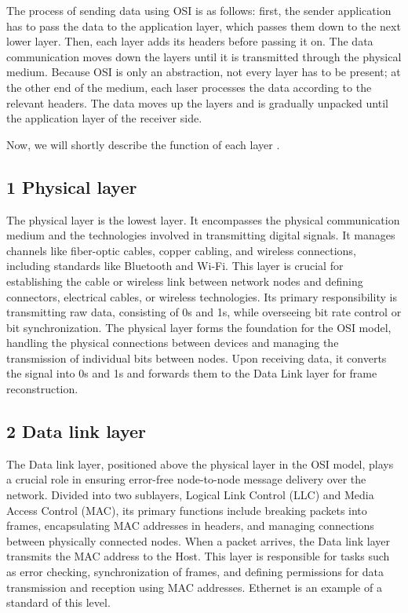 \documentclass[conference]{IEEEtran}
\begin{document}
The process of sending data using OSI is as follows: first, the sender application has to pass the data to the application layer, which passes them down to the next lower layer. Then, each layer adds its headers before passing it on. The data communication moves down the layers until it is transmitted through the physical medium. Because OSI is only an abstraction, not every layer has to be present; at the other end of the medium, each laser processes the data according to the relevant headers. The data moves up the layers and is gradually unpacked until the application layer of the receiver side.\cite{AWS-Amazon}

Now, we will shortly describe the function of each layer \cite{impreva-osi, geeks-osi}.
\subsection{1 Physical layer}
The physical layer is the lowest layer. It encompasses the physical communication medium and the technologies involved in transmitting digital signals. It manages channels like fiber-optic cables, copper cabling, and wireless connections, including standards like Bluetooth and Wi-Fi. This layer is crucial for establishing the cable or wireless link between network nodes and defining connectors, electrical cables, or wireless technologies. Its primary responsibility is transmitting raw data, consisting of 0s and 1s, while overseeing bit rate control or bit synchronization. The physical layer forms the foundation for the OSI model, handling the physical connections between devices and managing the transmission of individual bits between nodes. Upon receiving data, it converts the signal into 0s and 1s and forwards them to the Data Link layer for frame reconstruction.

\subsection{2 Data link layer}
The Data link layer, positioned above the physical layer in the OSI model, plays a crucial role in ensuring error-free node-to-node message delivery over the network. Divided into two sublayers, Logical Link Control (LLC) and Media Access Control (MAC), its primary functions include breaking packets into frames, encapsulating MAC addresses in headers, and managing connections between physically connected nodes. When a packet arrives, the Data link layer transmits the MAC address to the Host. This layer is responsible for tasks such as error checking, synchronization of frames, and defining permissions for data transmission and reception using MAC addresses. Ethernet is an example of a standard of this level.
\end{document}
